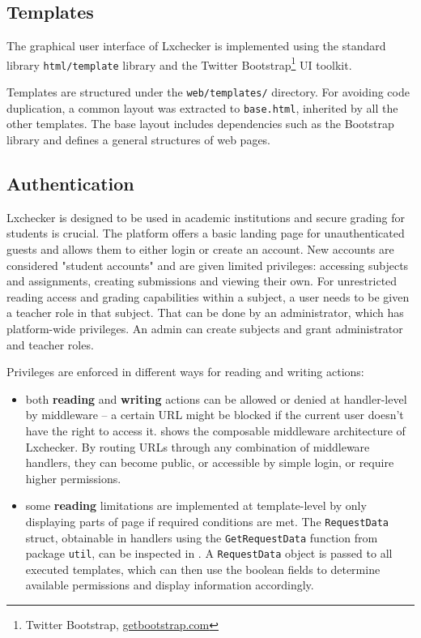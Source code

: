\subsection{Templates}
\label{sub-sec:templates}

The graphical user interface of Lxchecker is implemented using the standard library \texttt{html/template} library and the Twitter Bootstrap\footnote{Twitter Bootstrap, \url{getbootstrap.com}} UI toolkit.

Templates are structured under the \texttt{web/templates/} directory. For avoiding code duplication, a common layout was extracted to \texttt{base.html}, inherited by all the other templates. The base layout includes dependencies such as the Bootstrap library and defines a general structures of web pages.

\subsection{Authentication}
\label{sub-sec:authentication}

Lxchecker is designed to be used in academic institutions and secure grading for students is crucial. The platform offers a basic landing page for unauthenticated guests and allows them to either login or create an account. New accounts are considered "student accounts" and are given limited privileges: accessing subjects and assignments, creating submissions and viewing their own. For unrestricted reading access and grading capabilities within a subject, a user needs to be given a teacher role in that subject. That can be done by an administrator, which has platform-wide privileges. An admin can create subjects and grant administrator and teacher roles.

Privileges are enforced in different ways for reading and writing actions:
\begin{itemize}
	\item both \textbf{reading} and \textbf{writing} actions can be allowed or denied at handler-level by middleware -- a certain URL might be blocked if the current user doesn't have the right to access it.  shows the composable middleware architecture of Lxchecker. By routing URLs through any combination of middleware handlers, they can become public, or accessible by simple login, or require higher permissions.
	\item some \textbf{reading} limitations are implemented at template-level by only displaying parts of page if required conditions are met. The \texttt{RequestData} struct, obtainable in handlers using the \texttt{GetRequestData} function from package \texttt{util}, can be inspected in . A \texttt{RequestData} object is passed to all executed templates, which can then use the boolean fields to determine available permissions and display information accordingly.
\end{itemize}

